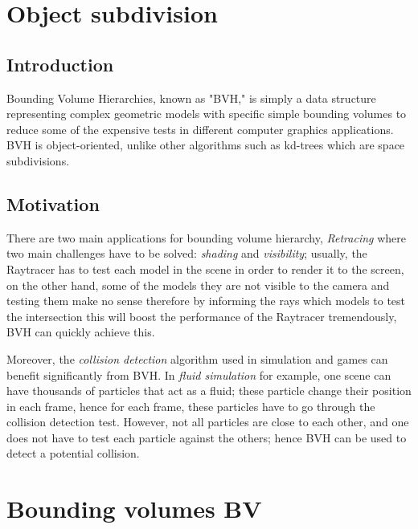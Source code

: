 \documentclass[11pt,a4paper]{article}
\begin{document}
	
	\section{Object subdivision}
	
		\subsection{Introduction}
	\label{definitions}
	Bounding Volume Hierarchies, known as "BVH," is simply a data structure representing complex geometric models with specific simple bounding volumes to reduce some of the expensive tests in different computer graphics applications.
	BVH is object-oriented, unlike other algorithms such as kd-trees which are space subdivisions.
	
	
	
	
	\subsection{Motivation}
	There are two main applications for bounding volume hierarchy, \textit{Retracing} where two main challenges have to be solved: \textit{shading} and \textit{visibility}; usually, the Raytracer has to test each model in the scene in order to render it to the screen, on the other hand, some of the models they are not visible to the camera and testing them make no sense therefore by informing the rays which models to test the intersection this will boost the performance of the Raytracer tremendously, BVH can quickly achieve this.
	
	Moreover, the \textit{collision detection} algorithm used in simulation and games can benefit significantly from BVH. In \textit{fluid simulation} for example, one scene can have thousands of particles that act as a fluid; these particle change their position in each frame, hence for each frame, these particles have to go through the collision detection test. However, not all particles are close to each other, and one does not have to test each particle against the others; hence BVH can be used to detect a potential collision. 
	
	
	
	
	\clearpage
	
	\section{Bounding volumes BV}
\end{document}
